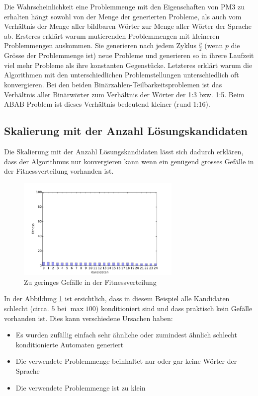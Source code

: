 Die Wahrscheinlichkeit eine Problemmenge mit den Eigenschaften von PM3 zu erhalten hängt sowohl von der Menge der generierten Probleme, als auch vom Verhältnis der Menge aller bildbaren Wörter zur Menge aller Wörter der Sprache ab. Ersteres erklärt warum mutierenden Problemmengen mit kleineren Problemmengen auskommen. Sie generieren nach jedem Zyklus $\frac{p}{2}$ (wenn $p$ die Grösse der Problemmenge ist) neue Probleme und generieren so in ihrere Laufzeit viel mehr Probleme als ihre konstanten Gegenstücke. Letzteres erklärt warum die Algorithmen mit den unterschiedlichen Problemstellungen unterschiedlich oft konvergieren. Bei den beiden Binärzahlen-Teilbarkeitsproblemen ist das Verhältnis aller Binärwörter zum Verhältnis der Wörter der 1:3 bzw. 1:5. Beim ABAB Problem ist dieses Verhältnis bedeutend kleiner (rund 1:16).

\subsection{Skalierung mit der Anzahl Lösungskandidaten}
Die Skalierung mit der Anzahl Lösungskandidaten lässt sich dadurch erklären, dass der Algorithmus nur konvergieren kann wenn ein genügend grosses Gefälle in der Fitnessverteilung vorhanden ist.

\begin{figure}[h]
  \centering
  \includegraphics[width=0.7\textwidth]{images/bars_fitness.pdf}
  \caption[Zu geringes Gefälle in der Fitnessverteilung]{Zu geringes Gefälle in der Fitnessverteilung}
  \label{fig:bars_fitness.pdf}
\end{figure}

In der Abbildung \ref{fig:bars_fitness.pdf} ist ersichtlich, dass in diesem Beispiel alle Kandidaten schlecht (circa. $5$ bei $\max 100$) konditioniert sind und dass praktisch kein Gefälle vorhanden ist. Dies kann verschiedene Ursachen haben:

\begin{itemize}
	\item Es wurden zufällig einfach sehr ähnliche oder zumindest ähnlich schlecht konditionierte Automaten generiert 
	\item Die verwendete Problemmenge beinhaltet nur oder gar keine Wörter der Sprache
	\item Die verwendete Problemmenge ist zu klein
\end{itemize}

